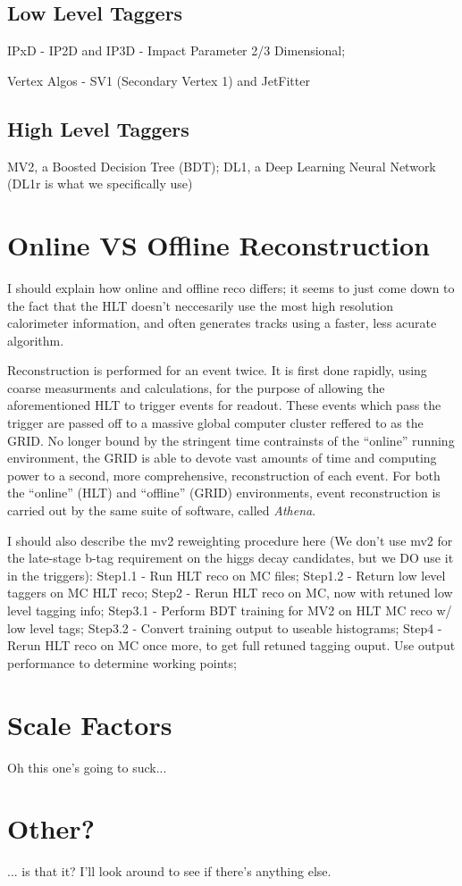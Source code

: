         \subsection{Low Level Taggers}

            IPxD - IP2D and IP3D - Impact Parameter 2/3 Dimensional; 

            Vertex Algos - SV1 (Secondary Vertex 1) and JetFitter

        \subsection{High Level Taggers}

            MV2, a Boosted Decision Tree (BDT);
            DL1, a Deep Learning Neural Network (DL1r is what we specifically use)
        \cite{bjet_id_and_performance}
        \cite{btagging_optimisation}

    \section{Online VS Offline Reconstruction}
        I should explain how online and offline reco differs;
            it seems to just come down to the fact that the HLT doesn't neccesarily use the most high resolution calorimeter information,
            and often generates tracks using a faster, less acurate algorithm.

        Reconstruction is performed for an event twice.
        It is first done rapidly, using coarse measurments and calculations,
            for the purpose of allowing the aforementioned HLT to trigger events for readout.
        These events which pass the trigger are passed off to a massive global computer cluster reffered to as the GRID.
        No longer bound by the stringent time contrainsts of the ``online'' running environment,
            the GRID is able to devote vast amounts of time and computing power to a second, 
            more comprehensive, reconstruction of each event.
        For both the ``online'' (HLT) and ``offline'' (GRID) environments, event reconstruction is carried out by the same suite of software,
            called \textit{Athena}.
            
        I should also describe the mv2 reweighting procedure here
            (We don't use mv2 for the late-stage b-tag requirement on the higgs decay candidates,
            but we DO use it in the triggers):
            Step1.1 - Run HLT reco on MC files;
            Step1.2 - Return low level taggers on MC HLT reco;
            Step2   - Rerun HLT reco on MC, now with retuned low level tagging info;
            Step3.1 - Perform BDT training for MV2 on HLT MC reco w/ low level tags;
            Step3.2 - Convert training output to useable histograms;
            Step4   - Rerun HLT reco on MC once more, to get full retuned tagging ouput. Use output performance to determine working points;


    \section{Scale Factors}
        Oh this one's going to suck...


    \section{Other?}
        ... is that it? I'll look around to see if there's anything else.



